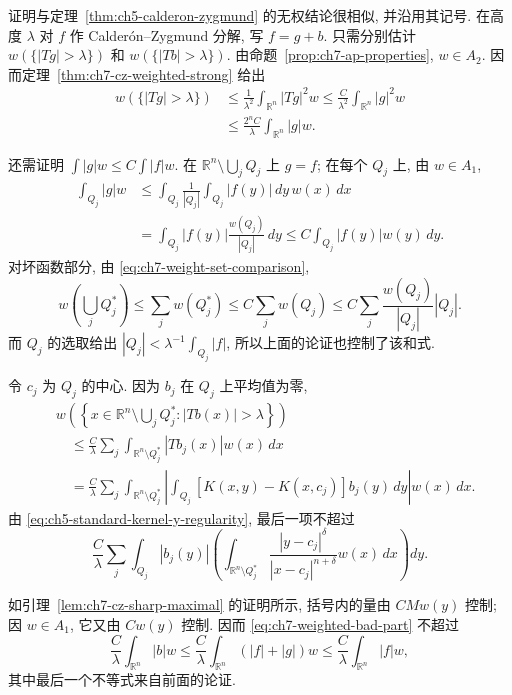 \begin{Proof}
证明与定理~\ref{thm:ch5-calderon-zygmund} 的无权结论很相似, 并沿用其记号. 在高度 $\lambda$ 对 $f$ 作 Calderón--Zygmund 分解, 写 $f=g+b$. 只需分别估计 $w(\{|Tg|>\lambda\})$ 和 $w(\{|Tb|>\lambda\})$. 由命题~\ref{prop:ch7-ap-properties}, $w\in A_2$. 因而定理~\ref{thm:ch7-cz-weighted-strong} 给出
\[
\begin{aligned}
 w(\{|Tg|>\lambda\})
 &\le\frac1{\lambda^2}\int_{\mathbb R^n}|Tg|^2w
 \le\frac C{\lambda^2}\int_{\mathbb R^n}|g|^2w\\
 &\le\frac{2^nC}{\lambda}\int_{\mathbb R^n}|g|w.
\end{aligned}
\]

\hypertarget{chapter-07-page-158}{}
还需证明 $\int|g|w\le C\int|f|w$. 在 $\mathbb R^n\setminus\bigcup_jQ_j$ 上 $g=f$; 在每个 $Q_j$ 上, 由 $w\in A_1$,
\[
\begin{aligned}
 \int_{Q_j}|g|w
 &\le\int_{Q_j}\frac1{|Q_j|}\int_{Q_j}|f(y)|\,dy\,w(x)\,dx\\
 &=\int_{Q_j}|f(y)|\frac{w(Q_j)}{|Q_j|}\,dy
 \le C\int_{Q_j}|f(y)|w(y)\,dy.
\end{aligned}
\]
对坏函数部分, 由 \eqref{eq:ch7-weight-set-comparison},
\[
 w\left(\bigcup_jQ_j^*\right)
 \le\sum_jw(Q_j^*)\le C\sum_jw(Q_j)
 \le C\sum_j\frac{w(Q_j)}{|Q_j|}|Q_j|.
\]
而 $Q_j$ 的选取给出 $|Q_j|<\lambda^{-1}\int_{Q_j}|f|$, 所以上面的论证也控制了该和式.

令 $c_j$ 为 $Q_j$ 的中心. 因为 $b_j$ 在 $Q_j$ 上平均值为零,
\[
\begin{aligned}
 &w\left(\left\{x\in\mathbb R^n\setminus\bigcup_jQ_j^*:|Tb(x)|>\lambda\right\}\right)\\
 &\quad\le\frac C\lambda\sum_j\int_{\mathbb R^n\setminus Q_j^*}|Tb_j(x)|w(x)\,dx\\
 &\quad=\frac C\lambda\sum_j\int_{\mathbb R^n\setminus Q_j^*}
 \left|\int_{Q_j}[K(x,y)-K(x,c_j)]b_j(y)\,dy\right|w(x)\,dx.
\end{aligned}
\]
由 \eqref{eq:ch5-standard-kernel-y-regularity}, 最后一项不超过
\begin{equation}
\label{eq:ch7-weighted-bad-part}
 \frac C\lambda\sum_j\int_{Q_j}|b_j(y)|
 \left(\int_{\mathbb R^n\setminus Q_j^*}
 \frac{|y-c_j|^\delta}{|x-c_j|^{n+\delta}}w(x)\,dx\right)dy.
\end{equation}

\hypertarget{chapter-07-page-159}{}
如引理~\ref{lem:ch7-cz-sharp-maximal} 的证明所示, 括号内的量由 $CMw(y)$ 控制; 因 $w\in A_1$, 它又由 $Cw(y)$ 控制. 因而 \eqref{eq:ch7-weighted-bad-part} 不超过
\[
 \frac C\lambda\int_{\mathbb R^n}|b|w
 \le\frac C\lambda\int_{\mathbb R^n}(|f|+|g|)w
 \le\frac C\lambda\int_{\mathbb R^n}|f|w,
\]
其中最后一个不等式来自前面的论证.
\end{Proof}

